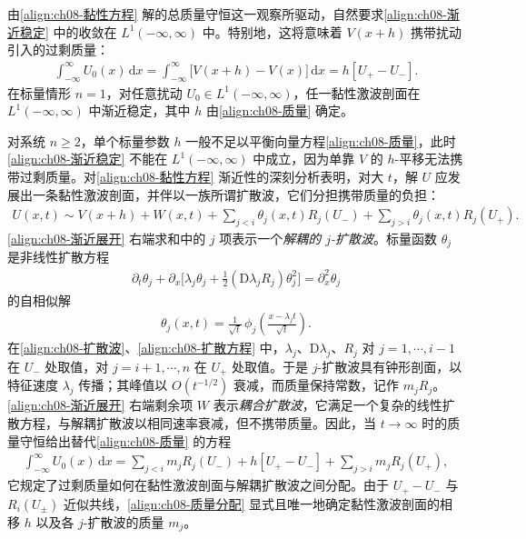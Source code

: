 \documentclass[../../main.tex]{subfiles}
\begin{document}
由\eqref{align:ch08-黏性方程} 解的总质量守恒这一观察所驱动，自然要求\eqref{align:ch08-渐近稳定} 中的收敛在 $L^1(-\infty,\infty)$ 中。特别地，这将意味着 $V(x+h)$ 携带扰动引入的过剩质量：
\begin{align}
\int_{-\infty}^{\infty}U_0(x)\,\mathrm{d}x=\int_{-\infty}^{\infty}\big[V(x+h)-V(x)\big]\,\mathrm{d}x=h[U_+-U_-].
\label{align:ch08-质量}
\end{align}
在标量情形 $n=1$，对任意扰动 $U_0\in L^1(-\infty,\infty)$，任一黏性激波剖面在 $L^1(-\infty,\infty)$ 中渐近稳定，其中 $h$ 由\eqref{align:ch08-质量} 确定。

对系统 $n\geqslant2$，单个标量参数 $h$ 一般不足以平衡向量方程\eqref{align:ch08-质量}，此时\eqref{align:ch08-渐近稳定} 不能在 $L^1(-\infty,\infty)$ 中成立，因为单靠 $V$ 的 $h$-平移无法携带过剩质量。对\eqref{align:ch08-黏性方程} 渐近性的深刻分析表明，对大 $t$，解 $U$ 应发展出一条黏性激波剖面，并伴以一族所谓扩散波，它们分担携带质量的负担：
\begin{align}
U(x,t)\sim V(x+h)+W(x,t)+\sum_{j<i}\theta_j(x,t)R_j(U_-)+\sum_{j>i}\theta_j(x,t)R_j(U_+).
\label{align:ch08-渐近展开}
\end{align}
\eqref{align:ch08-渐近展开} 右端求和中的 $j$ 项表示一个\emph{解耦的 $j$-扩散波}。标量函数 $\theta_j$ 是非线性扩散方程
\begin{align}
\partial_t\theta_j+\partial_x\Big[\lambda_j\theta_j+\tfrac12(\mathrm{D}\lambda_j R_j)\theta_j^2\Big]=\partial_x^2\theta_j
\label{align:ch08-扩散方程}
\end{align}
的自相似解
\begin{align}
\theta_j(x,t)=\frac{1}{\sqrt t}\,\phi_j\!\left(\frac{x-\lambda_j t}{\sqrt t}\right).
\label{align:ch08-扩散波}
\end{align}
在\eqref{align:ch08-扩散波}、\eqref{align:ch08-扩散方程} 中，$\lambda_j$、$\mathrm{D}\lambda_j$、$R_j$ 对 $j=1,\cdots,i-1$ 在 $U_-$ 处取值，对 $j=i+1,\cdots,n$ 在 $U_+$ 处取值。于是 $j$-扩散波具有钟形剖面，以特征速度 $\lambda_j$ 传播；其峰值以 $O(t^{-1/2})$ 衰减，而质量保持常数，记作 $m_j R_j$。\eqref{align:ch08-渐近展开} 右端剩余项 $W$ 表示\emph{耦合扩散波}，它满足一个复杂的线性扩散方程，与解耦扩散波以相同速率衰减，但不携带质量。因此，当 $t\to\infty$ 时的质量守恒给出替代\eqref{align:ch08-质量} 的方程
\begin{align}
\int_{-\infty}^{\infty}U_0(x)\,\mathrm{d}x=\sum_{j<i}m_jR_j(U_-)+h[U_+-U_-]+\sum_{j>i}m_jR_j(U_+),
\label{align:ch08-质量分配}
\end{align}
它规定了过剩质量如何在黏性激波剖面与解耦扩散波之间分配。由于 $U_+-U_-$ 与 $R_i(U_\pm)$ 近似共线，\eqref{align:ch08-质量分配} 显式且唯一地确定黏性激波剖面的相移 $h$ 以及各 $j$-扩散波的质量 $m_j$。
\end{document}
